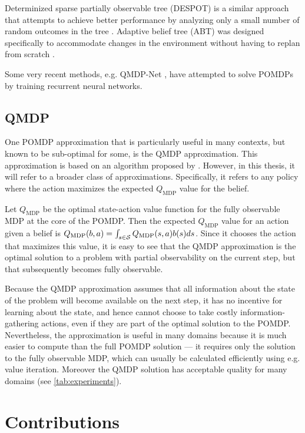 Determinized sparse partially observable tree (DESPOT) is a similar approach that attempts to achieve better performance by analyzing only a small number of random outcomes in the tree \cite{somani2013despot}.
Adaptive belief tree (ABT) was designed specifically to accommodate changes in the environment without having to replan from scratch \cite{kurniawati2016online}.

Some very recent methods, e.g. QMDP-Net \cite{karkus2017qmdp}, have attempted to solve POMDPs by training recurrent neural networks.

\subsection{QMDP} \label{sec:qmdp}

One POMDP approximation that is particularly useful in many contexts, but known to be sub-optimal for some, is the QMDP approximation.
This approximation is based on an algorithm proposed by \citet{littman1995learning}.
However, in this thesis, it will refer to a broader class of approximations.
Specifically, it refers to any policy where the action maximizes the expected $Q_\text{MDP}$ value for the belief.

Let $Q_\text{MDP}$ be the optimal state-action value function for the fully observable MDP at the core of the POMDP.
Then the expected $Q_\text{MDP}$ value for an action given a belief is $Q_\text{MDP}(b,a) = \int_{s \in \mathcal{S}} Q_\text{MDP}(s,a) b(s) ds$.
Since it chooses the action that maximizes this value, it is easy to see that the QMDP approximation is the optimal solution to a problem with partial observability on the current step, but that subsequently becomes fully observable.

Because the QMDP approximation assumes that all information about the state of the problem will become available on the next step, it has no incentive for learning about the state, and hence cannot choose to take costly information-gathering actions, even if they are part of the optimal solution to the POMDP.
Nevertheless, the approximation is useful in many domains because it is much easier to compute than the full POMDP solution --- it requires only the solution to the fully observable MDP, which can usually be calculated efficiently using e.g. value iteration.
Moreover the QMDP solution has acceptable quality for many domains (see \cref{tab:experiments}).

\section{Contributions}

